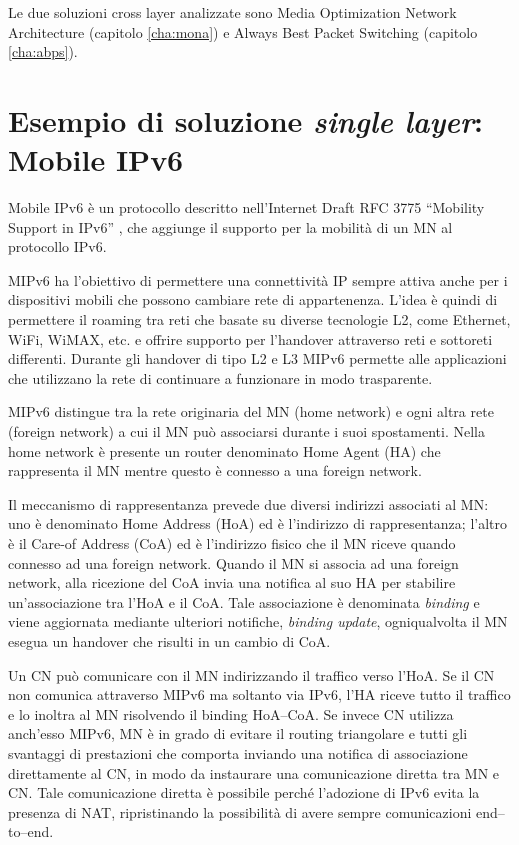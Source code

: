 \documentclass[12pt,a4paper,openright,twoside,draft]{book}
\begin{document}
Le due soluzioni cross layer analizzate sono Media Optimization
Network Architecture (capitolo \ref{cha:mona}) e Always Best Packet
Switching (capitolo \ref{cha:abps}).

\section{Esempio di soluzione \emph{single layer}: Mobile IPv6}

Mobile IPv6 è un protocollo descritto nell'Internet Draft RFC 3775
``Mobility Support in IPv6'' \cite{bib:mipv6}, che aggiunge il
supporto per la mobilità di un MN al protocollo IPv6.

MIPv6 ha l'obiettivo di permettere una connettività IP sempre attiva
anche per i dispositivi mobili che possono cambiare rete di
appartenenza. L'idea è quindi di permettere il roaming tra reti
che basate su diverse tecnologie L2, come Ethernet, WiFi, WiMAX,
etc. e offrire supporto per l'handover attraverso reti e sottoreti
differenti. Durante gli handover di tipo L2 e L3 MIPv6 permette alle
applicazioni che utilizzano la rete di continuare a funzionare in modo
trasparente.

MIPv6 distingue tra la rete originaria del MN (home network) e ogni
altra rete (foreign network) a cui il MN può associarsi durante i suoi
spostamenti. Nella home network è presente un router denominato Home
Agent (HA) che rappresenta il MN mentre questo è connesso a una
foreign network.

Il meccanismo di rappresentanza prevede due diversi indirizzi
associati al MN: uno è denominato Home Address (HoA) ed è l'indirizzo
di rappresentanza; l'altro è il Care-of Address (CoA) ed è l'indirizzo
fisico che il MN riceve quando connesso ad una foreign network. Quando
il MN si associa ad una foreign network, alla ricezione del CoA invia
una notifica al suo HA per stabilire un'associazione tra l'HoA e il
CoA. Tale associazione è denominata \emph{binding} e viene aggiornata
mediante ulteriori notifiche, \emph{binding update}, ogniqualvolta il
MN esegua un handover che risulti in un cambio di CoA.

Un CN può comunicare con il MN indirizzando il traffico verso
l'HoA. Se il CN non comunica attraverso MIPv6 ma soltanto via IPv6,
l'HA riceve tutto il traffico e lo inoltra al MN risolvendo il binding
HoA--CoA. Se invece CN utilizza anch'esso MIPv6, MN è in grado di
evitare il routing triangolare e tutti gli svantaggi di prestazioni
che comporta inviando una notifica di associazione direttamente al CN,
in modo da instaurare una comunicazione diretta tra MN e CN. Tale
comunicazione diretta è possibile perché l'adozione di IPv6 evita la
presenza di NAT, ripristinando la possibilità di avere sempre
comunicazioni end--to--end.
\end{document}
